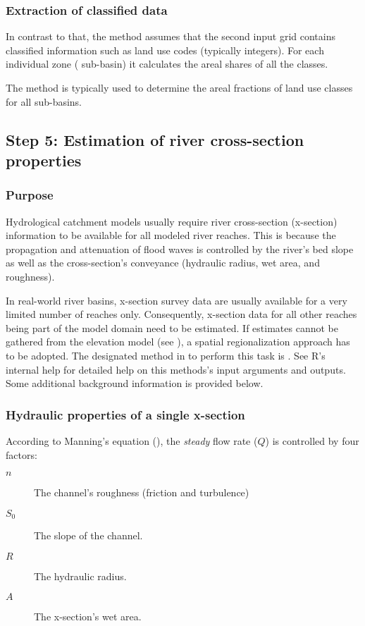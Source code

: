 \subsubsection*{Extraction of classified data}
In contrast to that, the  method assumes that the second input grid contains classified information such as land use codes (typically integers). For each individual zone (\ie{} sub-basin) it calculates the areal shares of all the classes.

The method is typically used to determine the areal fractions of land use classes for all sub-basins.

\subsection{Step 5: Estimation of river cross-section properties} \label{sec:topocatch:xsregio}

\subsubsection*{Purpose}
Hydrological catchment models usually require river cross-section (x-section) information to be available for all modeled river reaches. This is because the propagation and attenuation of flood waves is controlled by the river's bed slope as well as the cross-section's conveyance (hydraulic radius, wet area, and roughness).

In real-world river basins, x-section survey data are usually available for a very limited number of reaches only. Consequently, x-section data for all other reaches being part of the model domain need to be estimated. If estimates cannot be gathered from the elevation model (see ), a spatial regionalization approach has to be adopted. The designated method in  to perform this task is . See R's internal help for detailed help on this methods's input arguments and outputs. Some additional background information is provided below.

\subsubsection*{Hydraulic properties of a single x-section}
According to Manning's equation (), the \emph{steady} flow rate ($Q$) is controlled by four factors:
\begin{description}
  \item [$n$] The channel's roughness (friction and turbulence)
  \item [$S_0$] The slope of the channel.
  \item [$R$] The hydraulic radius.
  \item [$A$] The x-section's wet area.
\end{description}

